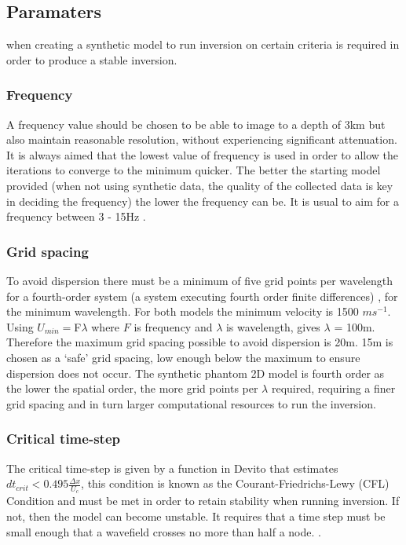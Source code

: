 \subsection{Paramaters}
when creating a synthetic model to run inversion on certain criteria is required in order to produce a stable inversion. 

\subsubsection{Frequency}
A frequency value should be chosen to be able to image to a depth of 3km but also maintain reasonable resolution, without experiencing significant attenuation. It is always aimed that the lowest value of frequency is used in order to allow the iterations to converge to the minimum quicker. The better the starting model provided (when not using synthetic data, the quality of the collected data is key in deciding the frequency) the lower the frequency can be. It is usual to aim for a frequency between 3 - 15Hz \citep{guasch20123d}. 
\subsubsection{Grid spacing}
To avoid dispersion there must be a minimum of five grid points per wavelength for a fourth-order system (a system executing fourth order finite differences) \citep{warner2013anisotropic}, for the minimum wavelength. For both models the minimum velocity is 1500 $ms^{-1}$. Using $U_{min} = $F$ \lambda$ where $F$ is frequency and $\lambda$ is wavelength, gives $\lambda$ = 100m. Therefore the maximum grid spacing possible to avoid dispersion is 20m. 15m is chosen as a `safe' grid spacing, low enough below the maximum to ensure dispersion does not occur. The synthetic phantom 2D model is fourth order as the lower the spatial order, the more grid points per $\lambda$ required, requiring a finer grid spacing and in turn larger computational resources to run the inversion. 
\subsubsection{Critical time-step}
The critical time-step is given by a function in Devito that estimates $dt_{crit} < 0.495 \frac{\Delta x}{U_{c}}$, this condition is known as the Courant-Friedrichs-Lewy (CFL) Condition and must be met in order to retain stability when running inversion. If not, then the model can become unstable. It requires that a time step must be small enough that a wavefield crosses no more than half a node.  \citep{courant1967partial}. 
